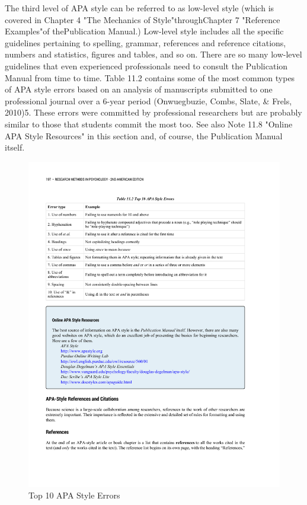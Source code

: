The third level of APA style can be referred to as low-level style (which is covered in Chapter 4 "The Mechanics of Style"throughChapter 7 "Reference Examples"of thePublication Manual.) Low-level style includes all the specific guidelines pertaining to spelling, grammar, references and reference citations, numbers and statistics, figures and tables, and so on. There are so many low-level guidelines that even experienced professionals need to consult the Publication Manual from time to time. Table 11.2 contains some of the most common types of APA style errors based on an analysis of manuscripts submitted to one professional journal over a 6-year period (Onwuegbuzie, Combs, Slate, \& Frels, 2010)5. These errors were committed by professional researchers but are probably similar to those that students commit the most too. See also Note 11.8 "Online APA Style Resources" in this section and, of course, the Publication Manual itself.



\begin{figure}
 



\includegraphics[width=\linewidth]{figures/C11mistakes.pdf}
 



\caption{Top 10 APA Style Errors}
 



\label{fig:mistakes}
 



\end{figure}

